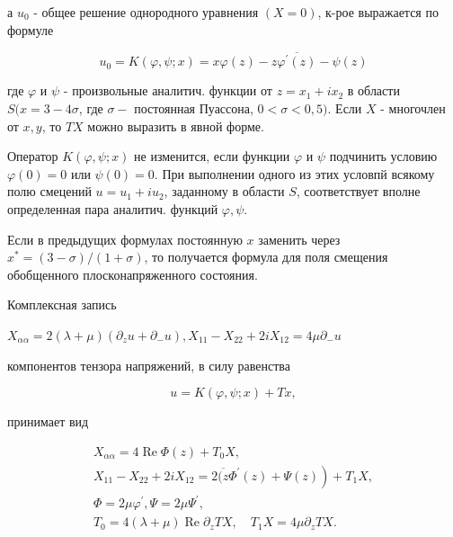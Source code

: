 \documentclass[10pt]{article}
\begin{document}
а $u_{0}$ - общее решение однородного уравнения $(X=0)$, к-рое выражается по формуле



\[

u_{0}=K(\varphi, \psi ; x)=x \varphi(z)-z \overline{\varphi^{\prime}(z)}-\psi(z)

\]



где $\varphi$ и $\psi$ - произвольные аналитич. функции от $z=x_{1}+i x_{2}$ в области $S(x=3-4 \sigma$, где $\sigma-$ постоянная Пуассона, $0<\sigma<0,5)$. Если $X$ - многочлен от $x, y$, то $T X$ можно выразить в явной форме.



Оператор $K(\varphi, \psi ; x)$ не изменится, если функции $\varphi$ и $\psi$ подчинить условию $\varphi(0)=0$ или $\psi(0)=0$. При выполнении одного из этих условпй всякому полю смецений $u=u_{1}+i u_{2}$, заданному в области $S$, соответствует вполне определенная пара аналитич. функций $\varphi, \psi$.



Если в предыдущих формулах постоянную $x$ заменить через $x^{*}=(3-\sigma) /(1+\sigma)$, то получается формула для поля смещения обобщенного плосконапряженного состояния.



Комплексная запись



$X_{\alpha \alpha}=2(\lambda+\mu)\left(\partial_{z} u+\partial_{-} u\right), X_{11}-X_{22}+2 i X_{12}=4 \mu \partial_{-} u$



компонентов тензора напряжений, в силу равенства



\[

u=K(\varphi, \psi ; x)+T x,

\]



принимает вид



\[

\begin{gathered}

X_{\alpha \alpha}=4 \operatorname{Re} \Phi(z)+T_{0} X, \\

\left.X_{11}-X_{22}+2 i X_{12}=2 \overline{(z} \Phi^{\prime}(z)+\Psi(z)\right)+T_{1} X, \\

\Phi=2 \mu \varphi^{\prime}, \Psi=2 \mu \Psi^{\prime}, \\

T_{0}=4(\lambda+\mu) \operatorname{Re} \partial_{z} T X, \quad T_{1} X=4 \mu \partial_{z} T X .

\end{gathered}

\]
\end{document}
